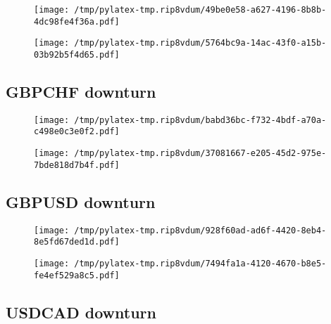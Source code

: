 \documentclass{article}%
\begin{document}
\begin{figure}[htbp]%
\centering%
\texttt{[image: /tmp/pylatex-tmp.rip8vdum/49be0e58-a627-4196-8b8b-4dc98fe4f36a.pdf]}%
\end{figure}

%


\begin{figure}[htbp]%
\centering%
\texttt{[image: /tmp/pylatex-tmp.rip8vdum/5764bc9a-14ac-43f0-a15b-03b92b5f4d65.pdf]}%
\end{figure}

%
\newpage %
\subsection{GBPCHF downturn}%
\label{subsec:GBPCHFdownturn}%


\begin{figure}[htbp]%
\centering%
\texttt{[image: /tmp/pylatex-tmp.rip8vdum/babd36bc-f732-4bdf-a70a-c498e0c3e0f2.pdf]}%
\end{figure}

%


\begin{figure}[htbp]%
\centering%
\texttt{[image: /tmp/pylatex-tmp.rip8vdum/37081667-e205-45d2-975e-7bde818d7b4f.pdf]}%
\end{figure}

%
\newpage %
\subsection{GBPUSD downturn}%
\label{subsec:GBPUSDdownturn}%


\begin{figure}[htbp]%
\centering%
\texttt{[image: /tmp/pylatex-tmp.rip8vdum/928f60ad-ad6f-4420-8eb4-8e5fd67ded1d.pdf]}%
\end{figure}

%


\begin{figure}[htbp]%
\centering%
\texttt{[image: /tmp/pylatex-tmp.rip8vdum/7494fa1a-4120-4670-b8e5-fe4ef529a8c5.pdf]}%
\end{figure}

%
\newpage %
\subsection{USDCAD downturn}%
\label{subsec:USDCADdownturn}%
\end{document}
